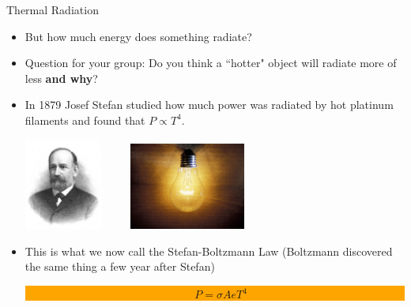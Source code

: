 \documentclass{beamer}
\begin{document}
\begin{frame}{Thermal Radiation}
\begin{itemize}
   \item But how much energy does something radiate?
   \item Question for your group: Do you think a ``hotter" object will radiate more of less {\bf and why}?
   \item<2-> In 1879 Josef Stefan studied how much power was radiated by hot platinum filaments and found that $P \propto T^4$.
\begin{center}
   \includegraphics[width=0.20\textwidth]{figures/stefan.jpg}
   ~~~~
   \includegraphics[width=0.30\textwidth]{figures/light_bulb.jpg}
\end{center}
\item<2-> This is what we now call the Stefan-Boltzmann Law (Boltzmann discovered the same thing a few year after Stefan)
\begin{center}
\colorbox{orange}{\parbox{0.3\textwidth}{
   \begin{eqnarray*}
      ~~~~~ P = \sigma A e T^4
   \end{eqnarray*}
}}
\end{center}
\end{itemize}
\end{frame}
\end{document}
